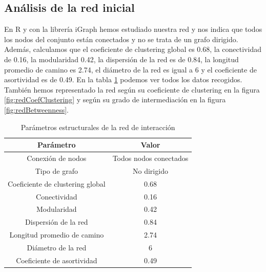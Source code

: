 \subsection{Análisis de la red inicial}
En R y con la librería iGraph hemos estudiado nuestra red y nos indica que todos los nodos del conjunto están conectados y no se trata de un grafo dirigido. Además, calculamos que el coeficiente de clustering global es 0.68, la conectividad de 0.16, la modularidad 0.42, la dispersión de la red es de 0.84, la longitud promedio de camino es 2.74, el diámetro de la red es igual a 6 y el coeficiente de asortividad es de 0.49. En la tabla \ref{tab:parametros_red} podemos ver todos los datos recogidos. También hemos representado la red según su coeficiente de clustering en la figura \ref{fig:redCoefClustering} y según su grado de intermediación en la figura \ref{fig:redBetweenness}.

\begin{table}[ht]
	\centering
	\begin{tabular}{|c|c|}
		\hline
		\textbf{Parámetro} & \textbf{Valor} \\ \hline
		Conexión de nodos & Todos nodos conectados \\ \hline
		Tipo de grafo & No dirigido \\ \hline
		Coeficiente de clustering global & 0.68 \\ \hline
		Conectividad & 0.16 \\ \hline
		Modularidad & 0.42 \\ \hline
		Dispersión de la red & 0.84 \\ \hline
		Longitud promedio de camino & 2.74 \\ \hline
		Diámetro de la red & 6 \\ \hline
		Coeficiente de asortividad & 0.49 \\ \hline
	\end{tabular}
	\caption{Parámetros estructurales de la red de interacción}
	\label{tab:parametros_red}
\end{table}

